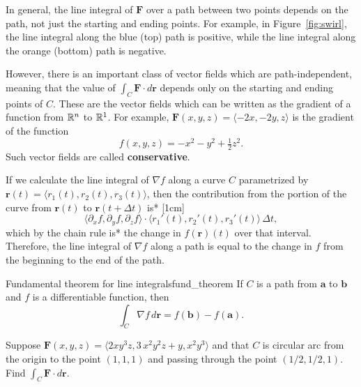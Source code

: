 \documentclass[svgnames]{report}
\begin{document}
In general, the line integral of $\mathbf{F}$ over a path between two
points depends on the path, not just the starting and ending points.
For example, in Figure~\ref{fig:swirl}, the line integral along the
blue (top) path is positive, while the line integral along the orange
(bottom) path is negative.

However, there is an important class of vector fields which are
path-independent, meaning that the value of $\int_C \mathbf{F} \cdot
d\mathbf{r}$ depends only on the starting and ending points of $C$.
These are the vector fields which can be written as the gradient of a
function from $\mathbb{R}^n$ to $\mathbb{R}^1$. For example, $\mathbf{F}(x,y,z) =
\langle -2x, -2y, z \rangle$ is the gradient of the function
\[
  f(x,y,z) = -x^2-y^2 + \tfrac{1}{2}z^2. 
\]
Such vector fields are called \textbf{conservative}. 

If we calculate the line integral of $\nabla f$ along a curve $C$
parametrized by $\mathbf{r}(t) = \langle r_1(t), r_2(t), r_3(t) \rangle$,
then the contribution from the portion of the curve from
$\mathbf{r}(t)$ to $\mathbf{r}(t+\Delta t)$ is*
[1cm]
\[
  \langle \partial_x f, \partial_y f, \partial_z f \rangle \cdot
  \langle r_1'(t), r_2'(t), r_3'(t) \rangle \, \Delta t, 
\]
which by the chain rule is* the change in
$f(\mathbf{r})(t)$ over that interval. Therefore, the line
integral of $\nabla f$ along a path is equal to the change in $f$ from
the beginning to the end of the path.

\begin{theo}{Fundamental theorem for line integrals}{fund_theorem}
  If $C$ is a path from $\mathbf{a}$ to $\mathbf{b}$ and $f$ is a
  differentiable function, then 
  \[
    \int_C \nabla f \, d\mathbf{r} = f(\mathbf{b}) - f(\mathbf{a}). 
  \]
\end{theo}

\begin{example}{}{}
  Suppose $\mathbf{F}(x,y,z) = \langle 2  x y^{3} z, 3 \, x^{2} y^{2}
  z + y, x^{2} y^{3} \rangle$ and that $C$ is circular arc from the
  origin to the point $(1,1,1)$ and passing through the point
  $(1/2,1/2,1)$. Find $\int_C \mathbf{F} \cdot d \mathbf{r}$. 
\end{example}
\end{document}
